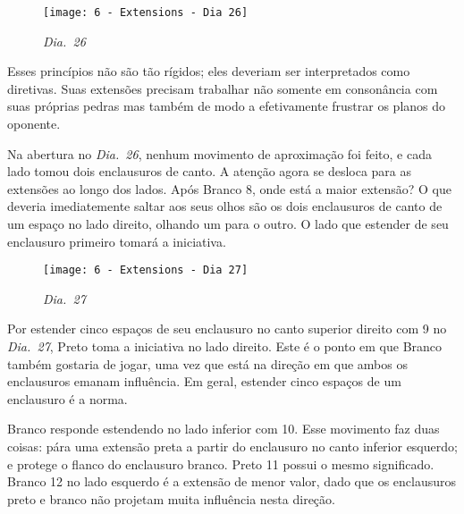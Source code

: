\pagebreak

\begin{wrapfigure}{r}{60mm}
    \vspace{-15pt}
    \begin{center}
        \texttt{[image: 6 - Extensions - Dia 26]}
        \captionsetup{justification=centering}
        \caption*{\emph{Dia.\@~26}}
    \end{center}
    \vspace{-20pt}
\end{wrapfigure}

Esses princípios não são tão rígidos; eles deveriam ser interpretados como diretivas. Suas extensões precisam trabalhar não somente em consonância com suas próprias pedras mas também de modo a efetivamente frustrar os planos do oponente.

Na abertura no \emph{Dia.\@~26}, nenhum movimento de aproximação foi feito, e cada lado tomou dois enclausuros de canto. A atenção agora se desloca para as extensões ao longo dos lados. Após Branco 8, onde está a maior extensão? O que deveria imediatemente saltar aos seus olhos são os dois enclausuros de canto de um espaço no lado direito, olhando um para o outro. O lado que estender de seu enclausuro primeiro tomará a iniciativa.

\begin{wrapfigure}{l}{60mm}
    \vspace{-27.5pt}
    \begin{center}
        \texttt{[image: 6 - Extensions - Dia 27]}
        \captionsetup{justification=centering}
        \caption*{\emph{Dia.\@~27}}
    \end{center}
    \vspace{-20pt}
\end{wrapfigure}

\bigskip

Por estender cinco espaços de seu enclausuro no canto superior direito com 9 no \emph{Dia.\@~27}, Preto toma a iniciativa no lado direito. Este é o ponto em que Branco também gostaria de jogar, uma vez que está na direção em que ambos os enclausuros emanam influência. Em geral, estender cinco espaços de um enclausuro é a norma.

Branco responde estendendo no lado inferior com 10. Esse movimento faz duas coisas: pára uma extensão preta a partir do enclausuro no canto inferior esquerdo; e protege o flanco do enclausuro branco. Preto 11 possui o mesmo significado. Branco 12 no lado esquerdo é a extensão de menor valor, dado que os enclausuros preto e branco não projetam muita influência nesta direção.

